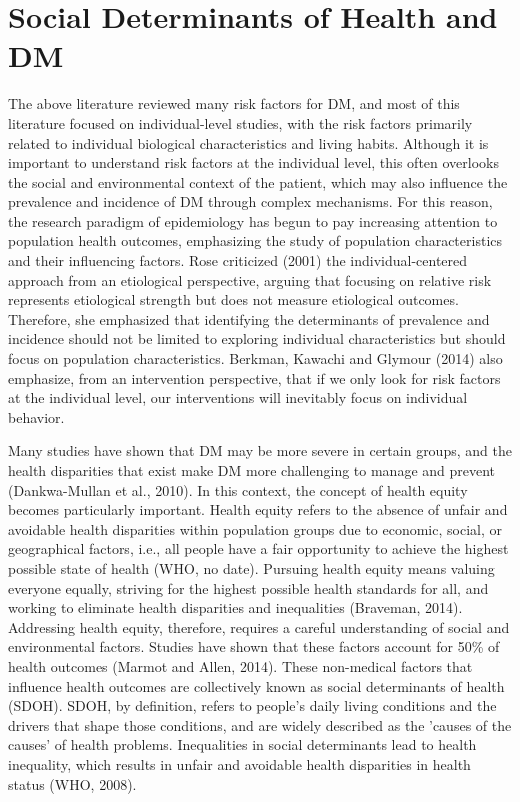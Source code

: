 \section{Social Determinants of Health and DM}
\label{sec:2.2}
The above literature reviewed many risk factors for DM, and most of this literature focused on individual-level studies, with the risk factors primarily related to individual biological characteristics and living habits. Although it is important to understand risk factors at the individual level, this often overlooks the social and environmental context of the patient, which may also influence the prevalence and incidence of DM through complex mechanisms. For this reason, the research paradigm of epidemiology has begun to pay increasing attention to population health outcomes, emphasizing the study of population characteristics and their influencing factors. Rose criticized (2001) the individual-centered approach from an etiological perspective, arguing that focusing on relative risk represents etiological strength but does not measure etiological outcomes. Therefore, she emphasized that identifying the determinants of prevalence and incidence should not be limited to exploring individual characteristics but should focus on population characteristics. Berkman, Kawachi and Glymour (2014) also emphasize, from an intervention perspective, that if we only look for risk factors at the individual level, our interventions will inevitably focus on individual behavior.

Many studies have shown that DM may be more severe in certain groups, and the health disparities that exist make DM more challenging to manage and prevent (Dankwa-Mullan et al., 2010). In this context, the concept of health equity becomes particularly important. Health equity refers to the absence of unfair and avoidable health disparities within population groups due to economic, social, or geographical factors, i.e., all people have a fair opportunity to achieve the highest possible state of health (WHO, no date). Pursuing health equity means valuing everyone equally, striving for the highest possible health standards for all, and working to eliminate health disparities and inequalities (Braveman, 2014). Addressing health equity, therefore, requires a careful understanding of social and environmental factors. Studies have shown that these factors account for 50\% of health outcomes (Marmot and Allen, 2014). These non-medical factors that influence health outcomes are collectively known as social determinants of health (SDOH). SDOH, by definition, refers to people's daily living conditions and the drivers that shape those conditions, and are widely described as the 'causes of the causes' of health problems. Inequalities in social determinants lead to health inequality, which results in unfair and avoidable health disparities in health status (WHO, 2008).

